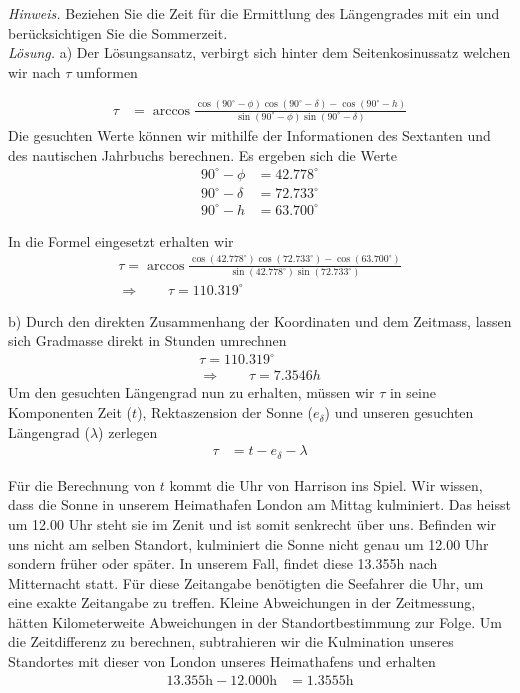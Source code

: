 \begin{refsection}
\textit{Hinweis.} Beziehen Sie die Zeit für die Ermittlung des Längengrades mit ein und berücksichtigen Sie die Sommerzeit. \\

\textit{Lösung.} \quad a) Der Lösungsansatz, verbirgt sich hinter dem Seitenkosinussatz welchen wir nach $\tau$ umformen

\begin{align*}
\tau &= \arccos 
\frac{ \cos(90^{\circ} - \phi) \cos(90^{\circ} - \delta) - \cos(90^{\circ} - h)} {\sin(90^{\circ} - \phi)\sin(90^{\circ} - \delta)}
\end{align*}
Die gesuchten Werte können wir mithilfe der Informationen des Sextanten und des nautischen Jahrbuchs berechnen. Es ergeben sich die Werte
\begin{align*}
90^{\circ} - \phi &= 42.778^{\circ}
\\
90^{\circ} - \delta &= 72.733^{\circ}
\\
90^{\circ} - h &= 63.700^{\circ}
\end{align*}

In die Formel eingesetzt erhalten wir
\begin{align*}
\tau = \arccos 
\frac{ \cos(42.778^{\circ}) \cos(72.733^{\circ}) - \cos(63.700^{\circ})} {\sin(42.778^{\circ})\sin(72.733^{\circ})} \\
\Rightarrow \quad \quad
\tau = 110.319^{\circ} 
\end{align*}

b) \quad  Durch den direkten Zusammenhang der Koordinaten und dem Zeitmass, lassen sich Gradmasse direkt in Stunden umrechnen
\begin{align*}
\tau = 110.319^{\circ} \\
\Rightarrow \quad \quad
\tau = 7.3546h
\end{align*}
Um den gesuchten Längengrad nun zu erhalten, müssen wir $\tau$ in seine Komponenten Zeit ($t$), Rektaszension der Sonne ($e_\delta$) und unseren gesuchten Längengrad ($\lambda$) zerlegen
\begin{align*}
\tau &= t - e_\delta - \lambda 
\end{align*}


Für die Berechnung von $t$ kommt die Uhr von Harrison ins Spiel. Wir wissen, dass die Sonne in unserem Heimathafen London am Mittag kulminiert. Das heisst um 12.00 Uhr steht sie im Zenit und ist somit senkrecht über uns. 
Befinden wir uns nicht am selben Standort, kulminiert die Sonne nicht genau um 12.00 Uhr sondern früher oder später.
In unserem Fall, findet diese 13.355h nach Mitternacht statt. Für diese Zeitangabe benötigten die Seefahrer die Uhr, um eine exakte Zeitangabe zu treffen. Kleine Abweichungen in der Zeitmessung, hätten Kilometerweite Abweichungen in der Standortbestimmung zur Folge.
Um die Zeitdifferenz zu berechnen, subtrahieren wir die Kulmination unseres Standortes mit dieser von London unseres Heimathafens und erhalten
\begin{align*}
13.355 \text{h} - 12.000 \text{h} &= 1.3555 \text{h}
\end{align*}


\end{refsection}
